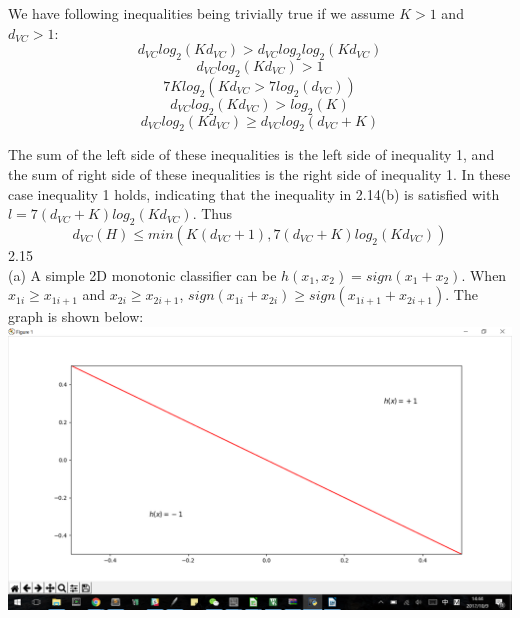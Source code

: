 \documentclass[12pt]{article}
\begin{document}
We have following inequalities being trivially true if we assume $K>1$ and $d_{VC}> 1$:
$$d_{VC}log_2(Kd_{VC})>d_{VC}log_2log_2(Kd_{VC})$$
$$d_{VC}log_2(Kd_{VC})>1$$
$$7Klog_2(Kd_{VC}>7log_2(d_{VC}))$$
$$d_{VC}log_2(Kd_{VC})>log_2(K)$$
$$d_{VC}log_2(Kd_{VC})\geq d_{VC}log_2(d_{VC}+K)$$

The sum of the left side of these inequalities is the left side of inequality 1, and the sum of right side of these inequalities is the right side of inequality 1. In these case inequality 1 holds, indicating that the inequality in 2.14(b) is satisfied with $l=7(d_{VC}+K)log_2(Kd_{VC})$. Thus $$d_{VC}(H)\leq min(K(d_{VC}+1),7(d_{VC}+K)log_2(Kd_{VC}))$$
2.15\\
(a) A simple 2D monotonic classifier can be $h(x_1,x_2) = sign(x_1+x_2)$. When $x_{1i}\geq x_{1i+1}$ and $x_{2i}\geq x_{2i+1}$, $sign(x_{1i}+x_{2i})\geq sign(x_{1i+1}+x_{2i+1})$. The graph is shown below:\\
\includegraphics[scale=0.6]{monotonic}\\
\end{document}
